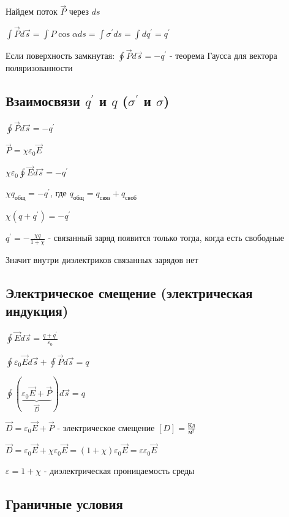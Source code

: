 \documentclass[12pt]{article}
\begin{document}
Найдем поток $\vec{P}$ через $ds$

$\int \vec{P} d\vec{s} = \int P\cos\alpha ds = \int \sigma^\prime ds = \int dq^\prime = q^\prime$

Если поверхность замкнутая: $\oint \vec{P} d\vec{s} = -q^\prime$ - теорема Гаусса для вектора поляризованности

\subsection{Взаимосвязи $q^\prime$ и $q$ ($\sigma^\prime$ и $\sigma$)}

$\oint \vec{P} d\vec{s} = -q^\prime$

$\vec{P} = \chi \varepsilon_0 \vec{E}$

$\chi \varepsilon_0 \oint \vec{E} d\vec{s} = -q^\prime$

$\chi q_{\text{общ}} = -q^\prime$, где $q_\text{общ} = q_{\text{связ}} + q_\text{своб}$

$\chi (q + q^\prime) = -q^\prime$

$q^\prime = -\frac{\chi q}{1 + \chi}$ - связанный заряд появится только тогда, когда есть свободные

Значит внутри диэлектриков связанных зарядов нет

\subsection{Электрическое смещение (электрическая индукция)}

\Mem $\oint \vec{E} d\vec{s} = \frac{q + q^\prime}{\varepsilon_0}$

$\oint \varepsilon_0 \vec{E} d\vec{s} + \oint \vec{P}d\vec{s} = q$

$\oint (\underset{\vec{D}}{\underbrace{\varepsilon_0 \vec{E} + \vec{P}}}) d\vec{s} = q$

$\vec{D} = \varepsilon_0 \vec{E} + \vec{P}$ - электрическое смещение \hfill $[D] = \frac{\text{Кл}}{\text{м}^2}$

$\vec{D} = \varepsilon_0 \vec{E} + \chi \varepsilon_0 \vec{E} = (1 + \chi) \varepsilon_0 \vec{E} = \varepsilon \varepsilon_0 \vec{E}$

$\varepsilon = 1 + \chi$ - диэлектрическая проницаемость среды

\subsection{Граничные условия}
\end{document}
